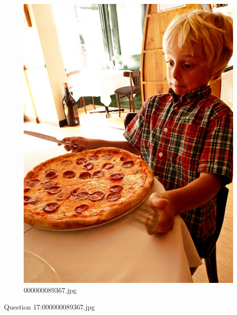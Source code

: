     \begin{figure}[h]
        \centering
        \includegraphics[width=0.8\linewidth]{../image set/easy/000000089367.jpg}
        \caption{000000089367.jpg}
    \end{figure}
    Question 17:000000089367.jpg
